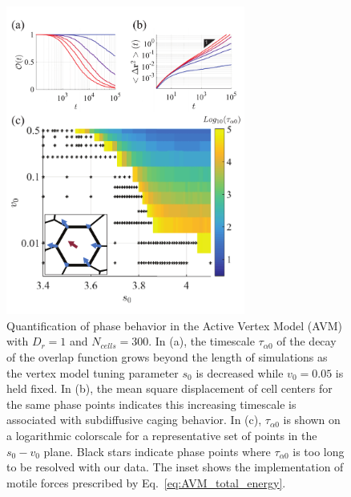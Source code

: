 \documentclass[
reprint
,aps
,amssymb
,amsmath
,superscriptaddress
]{revtex4-1}
\begin{document}
\begin{figure}[!t]  
\begin{center}
    \includegraphics[width=0.7\textwidth]{manuscript_images_avm_with_phases.pdf}
    \caption{\label{fig:AVM_phase_behavior} Quantification of phase behavior in the Active Vertex Model (AVM) with $D_r=1$ and $N_{cells}=300$. In (a), the timescale $\tau_{\alpha0}$ of the decay of the overlap function grows beyond the length of simulations as the vertex model tuning parameter $s_0$ is decreased while $v_0=0.05$ is held fixed. In (b), the mean square displacement of cell centers for the same phase points indicates this increasing timescale is associated with subdiffusive caging behavior. In (c), $\tau_{\alpha0}$ is shown on a logarithmic colorscale for a representative set of points in the $s_0-v_0$ plane. Black stars indicate phase points where $\tau_{\alpha0}$ is too long to be resolved with our data. The inset shows the implementation of motile forces prescribed by Eq.~\eqref{eq:AVM_total_energy}. }
    \end{center}
\end{figure}

\end{document}
